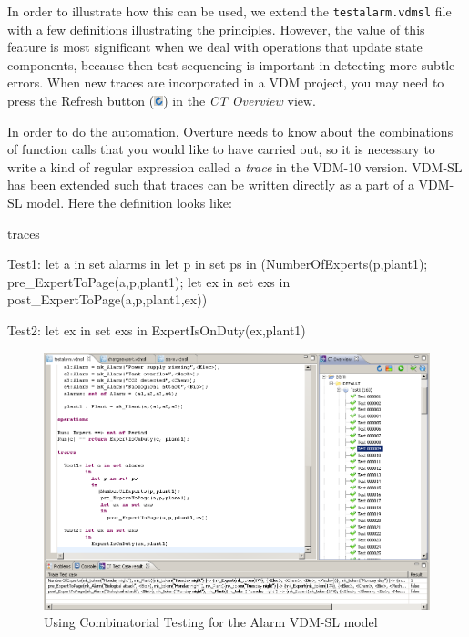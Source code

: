 In order to illustrate how this can be used, we extend the \texttt{testalarm.vdmsl} file with a few definitions illustrating the principles. However, the value of this feature is most significant
when we deal with operations that update state components, because then test sequencing is important in detecting more subtle errors. When new traces are incorporated in a VDM project, you may need
to press the \textsf{Refresh} button (\includegraphics[width=0.02\textwidth]{figures/refresh}) in the
\emph{CT Overview} view.

In order to do the automation, Overture needs to know about the combinations of function calls that you would like to have carried out, so it is necessary to write a kind of regular expression called a
\emph{trace} in the VDM-10 version. VDM-SL has been extended such that traces can be written directly as a part of a VDM-SL model. Here the definition looks like:
%
\begin{vdmsl}
traces

  Test1: let a in set alarms
         in
           let p in set ps 
           in
             (NumberOfExperts(p,plant1);
              pre_ExpertToPage(a,p,plant1);
              let ex in set exs
              in
                post_ExpertToPage(a,p,plant1,ex))
               
  Test2: let ex in set exs
         in
           ExpertIsOnDuty(ex,plant1)
\end{vdmsl}
%
\begin{figure}[htbp]
\begin{center}
\includegraphics[width=5.5in]{figures/tracesalarm}
\caption{Using Combinatorial Testing for the Alarm VDM-SL model\label{fig:stracesalarm}}
\end{center}
\end{figure}

